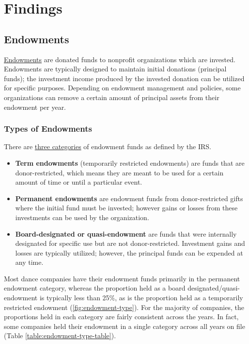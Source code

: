 \documentclass[Dance Data
Project,article,submit,moreauthors,pdftex]{mdpi}
\begin{document}
\hypertarget{findings}{%
\section{Findings}\label{findings}}

\hypertarget{endowments}{%
\subsection{Endowments}\label{endowments}}

\href{https://www.investopedia.com/terms/e/endowment.asp}{Endowments}
are donated funds to nonprofit organizations which are invested.
Endowments are typically designed to maintain initial donations
(principal funds); the investment income produced by the invested
donation can be utilized for specific purposes. Depending on endowment
management and policies, some organizations can remove a certain amount
of principal assets from their endowment per year.

\hypertarget{types-of-endowments}{%
\subsubsection{Types of Endowments}\label{types-of-endowments}}

There are \href{https://www.irs.gov/instructions/i990sd}{three
categories} of endowment funds as defined by the IRS.

\begin{itemize}
\item \textbf{Term endowments} (temporarily restricted endowments) are funds that are donor-restricted, which means they are meant to be used for a certain amount of time or until a particular event. 
\item \textbf{Permanent endowments} are endowment funds from donor-restricted gifts where the initial fund must be invested; however gains or losses from these investments can be used by the organization.  
\item \textbf{Board-designated or quasi-endowment} are funds that were internally designated for specific use but are not donor-restricted.  Investment gains and losses are typically utilized; however, the principal funds can be expended at any time.
\end{itemize}

Most dance companies have their endowment funds primarily in the
permanent endowment category, whereas the proportion held as a board
designated/quasi-endowment is typically less than 25\%, as is the
proportion held as a temporarily restricted endowment
(\ref{fig:endowment-type}). For the majority of companies, the
proportions held in each category are fairly consistent across the
years. In fact, some companies held their endowment in a single category
across all years on file (Table \ref{table:endowment-type-table}).
\end{document}
